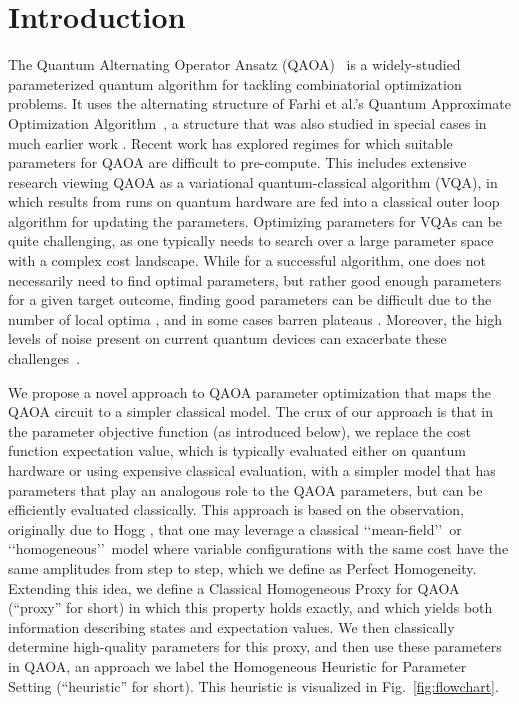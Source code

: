 \documentclass[superscriptaddress,pra,aps,10pt,longbibliography,notitlepage]{revtex4-1}
\begin{document}
\maketitle


\section{Introduction}\label{introduction}

The Quantum Alternating Operator Ansatz (QAOA)~\cite{hadfield19} is a widely-studied parameterized quantum algorithm for tackling combinatorial optimization problems. It uses the alternating structure of Farhi et al.’s Quantum Approximate Optimization Algorithm~\cite{farhi14}, a structure that was also studied in special cases in much earlier work \cite{hogg00, hogg00-1}. Recent work has explored regimes for which suitable parameters for QAOA are difficult to pre-compute. This includes extensive research viewing QAOA as a variational quantum-classical algorithm (VQA), in which results from runs on quantum hardware are fed into a classical outer loop algorithm for updating the parameters. Optimizing parameters for VQAs can be quite challenging, as one typically needs to search over a large parameter space with a complex cost landscape. While for a successful algorithm, one does not necessarily need to find optimal parameters, but rather good enough  parameters for a given target outcome, finding good parameters can be difficult due to the number of local optima \cite{cerezo21, wierichs20}, and in some cases barren plateaus \cite{mcclean18, larocca22}. Moreover, the high levels of noise present on current quantum devices can exacerbate these challenges~\cite{wang21}. 

We propose a novel approach to QAOA parameter optimization that maps the QAOA circuit to a simpler classical model. The crux of our approach is that in the parameter objective function (as introduced below), we replace the cost function expectation value, which is typically evaluated either on quantum hardware or using expensive classical evaluation, with a simpler model that has parameters that play an analogous role to the QAOA parameters, but can be efficiently evaluated classically. This approach is based on the observation, originally due to Hogg \cite{hogg00, hogg00-1}, that one may leverage a classical \lq\lq mean-field\rq\rq\ or \lq\lq homogeneous\rq\rq\ model where variable configurations with the same cost have the same amplitudes from step to step, which we define as Perfect Homogeneity. Extending this idea, we define a Classical Homogeneous Proxy for QAOA (``proxy'' for short) in which this property holds exactly, and which yields both information describing states and expectation values. We then classically determine high-quality parameters for this proxy, and then use these parameters in QAOA, an approach we label the Homogeneous Heuristic for Parameter Setting (``heuristic'' for short). This heuristic is visualized in Fig.~\ref{fig:flowchart}. 
\end{document}
